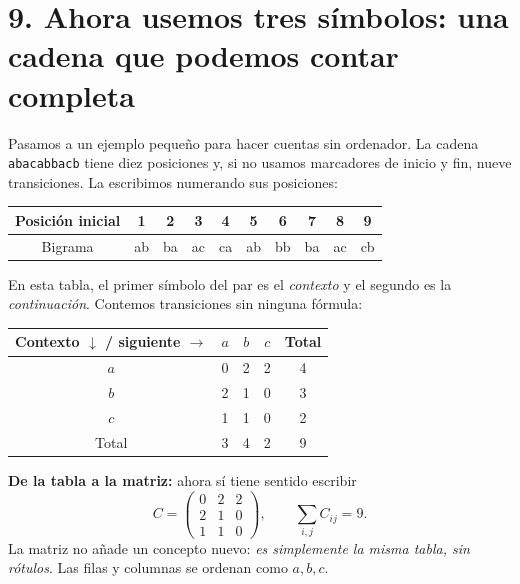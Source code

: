 \section*{9. Ahora usemos tres símbolos: una cadena que podemos contar completa}
Pasamos a un ejemplo pequeño para hacer cuentas sin ordenador. La cadena \texttt{abacabbacb} tiene diez posiciones y, si no usamos marcadores de inicio y fin, nueve transiciones. La escribimos numerando sus posiciones:
\begin{center}
\end{center}
\begin{center}
\begin{tabular}{c|ccccccccc}\toprule
Posición inicial &1&2&3&4&5&6&7&8&9\\\midrule
Bigrama & ab&ba&ac&ca&ab&bb&ba&ac&cb\\\bottomrule
\end{tabular}
\end{center}
En esta tabla, el primer símbolo del par es el \emph{contexto} y el segundo es la \emph{continuación}. Contemos transiciones sin ninguna fórmula:
\begin{center}
\begin{tabular}{c|ccc|c}\toprule
Contexto $\downarrow$ / siguiente $\to$ & $a$&$b$&$c$&Total\\\midrule
$a$&0&2&2&4\\
$b$&2&1&0&3\\
$c$&1&1&0&2\\\midrule
Total&3&4&2&9\\\bottomrule
\end{tabular}
\end{center}
\textbf{De la tabla a la matriz:} ahora sí tiene sentido escribir
\[
C=\begin{pmatrix}0&2&2\\2&1&0\\1&1&0\end{pmatrix},
\qquad\sum_{i,j}C_{ij}=9.
\]
La matriz no añade un concepto nuevo: \emph{es simplemente la misma tabla, sin rótulos}. Las filas y columnas se ordenan como $a,b,c$.

